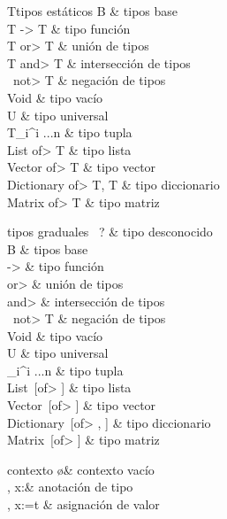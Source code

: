 \bigskip
\hspace*{-2cm}
\begin{grammar}{T}{tipos estáticos}
B                            & tipos base \\ %
T -> T                       & tipo función \\
T \<or> T                    & unión de tipos \\
T \<and> T                   & intersección de tipos \\
\ \<not> T                     & negación de tipos \\
Void                         & tipo vacío \\
U                            & tipo universal \\
{T_i}^{i ...n}          & tipo tupla \\
List \<of> T                 & tipo lista \\
Vector \<of> T               & tipo vector \\
Dictionary \<of> T, T        & tipo diccionario \\
Matrix \<of> T               & tipo matriz \\
\end{grammar}

\bigskip
\begin{grammar}{\tau}{tipos graduales}
\ ?                            & tipo desconocido \\
B                            & tipos base \\ %
\tau -> \tau                 & tipo función \\
\tau \<or> \tau              & unión de tipos \\
\tau \<and> \tau             & intersección de tipos \\
\ \<not> T                     & negación de tipos \\
Void                         & tipo vacío \\
U                            & tipo universal \\
{\tau_i}^{i ...n}       & tipo tupla \\
List\ [\<of> \tau]           & tipo lista \\
Vector\ [\<of> \tau]         & tipo vector \\
Dictionary\ [\<of> \tau, \tau]      & tipo diccionario \\
Matrix\ [\<of> \tau]         & tipo matriz \\
\end{grammar}

\bigskip
\begin{grammar}{\Gamma}{contexto}
\o               & contexto vacío \\
\Gamma, x:\tau   & anotación de tipo \\
\Gamma, x:=t     & asignación de valor \\
\end{grammar}
